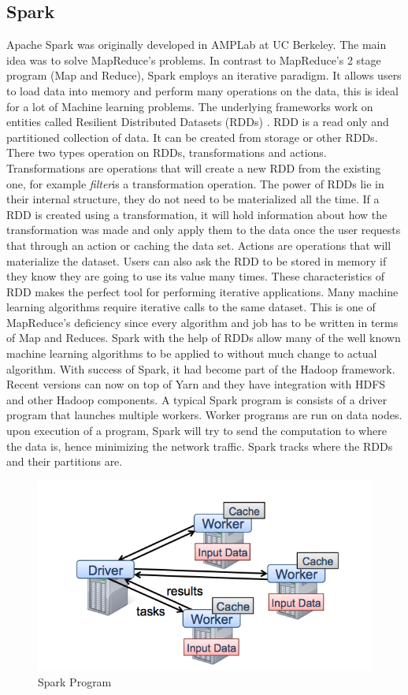 \documentclass[english]{tktltiki}
\begin{document}
\subsection{Spark}
Apache Spark \cite{zaharia10} was originally developed in AMPLab at UC Berkeley. The main idea was to solve MapReduce's problems. In contrast to MapReduce's 2 stage program (Map and Reduce), Spark employs an iterative paradigm. It allows users to load data into memory and perform many operations on the data, this is ideal for a lot of Machine learning problems. The underlying frameworks work on entities called Resilient Distributed Datasets (RDDs) \cite{zaharia12}. RDD  is a read only and partitioned collection of data. It can be created from storage or other RDDs. There two types operation on RDDs, transformations and actions. Transformations are operations that will create a new RDD from the existing one, for example \textit{filter}is a transformation operation. The power of RDDs lie in their internal structure, they do not need to be materialized all the time. If a RDD is created using a transformation, it will hold information about how the transformation was made and only apply them to the data once the user requests that through an action or caching the data set. Actions are operations that will materialize the dataset. Users can also ask the RDD to be stored in memory if they know they are going to use its value many times. These characteristics of RDD makes the perfect tool for performing iterative applications. Many machine learning algorithms require iterative calls to the same dataset. This is one of MapReduce's deficiency since every algorithm and job has to be written in terms of Map and Reduces. Spark with the help of RDDs allow many of the well known machine learning algorithms to be applied to without much change to actual algorithm. With success of Spark, it had become part of the Hadoop framework. Recent versions can now on top of Yarn and they have integration with HDFS and other Hadoop components. 
A typical Spark program is consists of a driver program that launches multiple workers. Worker programs are run on data nodes. upon execution of a program, Spark will try to send the computation to where the data is, hence minimizing the network traffic. Spark tracks where the RDDs and their partitions are.
\begin{figure}[ht!]
\centering
\includegraphics[width=130mm]{figures/sparkprogram.png}
\caption{Spark Program}
\label{fig:sparkprogram}
\end{figure}
\end{document}
